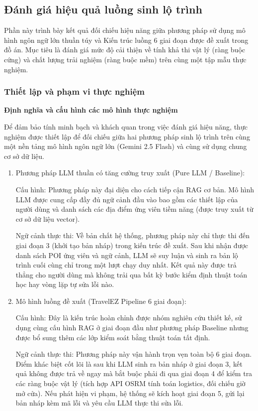\subsection{Đánh giá hiệu quả luồng sinh lộ trình}
Phần này trình bày kết quả đối chiếu hiệu năng giữa phương pháp sử dụng mô hình ngôn ngữ lớn thuần túy và Kiến trúc luồng 6 giai đoạn được đề xuất trong đồ án. Mục tiêu là đánh giá mức độ cải thiện về tính khả thi vật lý (ràng buộc cứng) và chất lượng trải nghiệm (ràng buộc mềm) trên cùng một tập mẫu thực nghiệm.

\subsubsection{Thiết lập và phạm vi thực nghiệm}

\textbf{Định nghĩa và cấu hình các mô hình thực nghiệm} 

Để đảm bảo tính minh bạch và khách quan trong việc đánh giá hiệu năng, thực nghiệm được thiết lập để đối chiếu giữa hai phương pháp sinh lộ trình trên cùng một nền tảng mô hình ngôn ngữ lớn (Gemini 2.5 Flash) và cùng sử dụng chung cơ sở dữ liệu.

\begin{enumerate}
    \item Phương pháp LLM thuần có tăng cường truy xuất (Pure LLM / Baseline):
    
    Cấu hình: Phương pháp này đại diện cho cách tiếp cận RAG cơ bản. Mô hình LLM được cung cấp đầy đủ ngữ cảnh đầu vào bao gồm các thiết lập của người dùng và danh sách các địa điểm ứng viên tiềm năng (được truy xuất từ cơ sở dữ liệu vector).
    
    Ngữ cảnh thực thi: Về bản chất hệ thống, phương pháp này chỉ thực thi đến giai đoạn 3 (khởi tạo bản nháp) trong kiến trúc đề xuất. Sau khi nhận được danh sách POI ứng viên và ngữ cảnh, LLM sẽ suy luận và sinh ra bản lộ trình cuối cùng chỉ trong một lượt chạy duy nhất. Kết quả này được trả thẳng cho người dùng mà không trải qua bất kỳ bước kiểm định thuật toán học hay vòng lặp tự sửa lỗi nào.
    
    \item Mô hình luồng đề xuất (TravelEZ Pipeline 6 giai đoạn):
    
    Cấu hình: Đây là kiến trúc hoàn chỉnh được nhóm nghiên cứu thiết kế, sử dụng cùng cấu hình RAG ở giai đoạn đầu như phương pháp Baseline nhưng được bổ sung thêm các lớp kiểm soát bằng thuật toán tất định.
    
    Ngữ cảnh thực thi: Phương pháp này vận hành trọn vẹn toàn bộ 6 giai đoạn. Điểm khác biệt cốt lõi là sau khi LLM sinh ra bản nháp ở giai đoạn 3, kết quả không được trả về ngay mà bắt buộc phải đi qua giai đoạn 4 để kiểm tra các ràng buộc vật lý (tích hợp API OSRM tính toán logistics, đối chiếu giờ mở cửa). Nếu phát hiện vi phạm, hệ thống sẽ kích hoạt giai đoạn 5, gửi lại bản nháp kèm mã lỗi và yêu cầu LLM thực thi sửa lỗi.
\end{enumerate}

